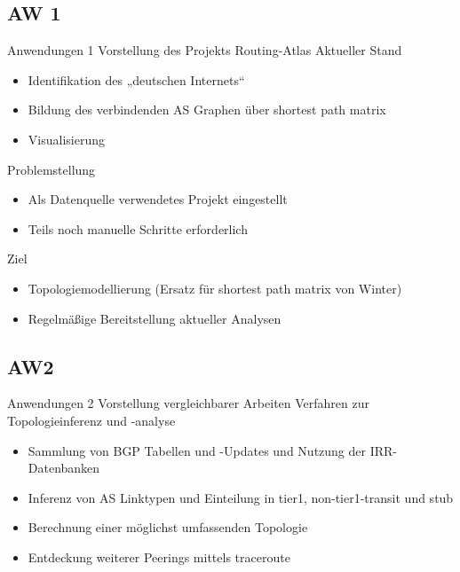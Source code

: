 \documentclass[ngerman,compress,hyperref={bookmarks}]{beamer}
\begin{document}
\subsection{AW 1}
\begin{frame}{Anwendungen 1 \cite{KrohnAW1}}{Vorstellung des Projekts Routing-Atlas}
  Aktueller Stand\\
  \begin{itemize}
    \item Identifikation des „deutschen Internets“
    \item Bildung des verbindenden AS Graphen über shortest path matrix
    \item Visualisierung
  \end{itemize}
  \vspace{0.3cm}
  Problemstellung\\
  \begin{itemize}
    \item Als Datenquelle verwendetes Projekt eingestellt
    \item Teils noch manuelle Schritte erforderlich
  \end{itemize}
  \vspace{0.3cm}
  Ziel\\
  \begin{itemize}
    \item Topologiemodellierung (Ersatz für shortest path matrix von Winter)
    \item Regelmäßige Bereitstellung aktueller Analysen
  \end{itemize}
\end{frame}

\subsection{AW2}
\begin{frame}{Anwendungen 2 \cite{KrohnAW2}}{Vorstellung vergleichbarer Arbeiten}
  Verfahren zur Topologieinferenz und -analyse
  \begin{itemize}
    \item Sammlung von BGP Tabellen und -Updates und Nutzung der IRR-Datenbanken \cite{Zhang:2005:CIA:1052812.1052825}
    \item Inferenz von AS Linktypen und Einteilung in tier1, non-tier1-transit und stub \cite{Gao:2001:IAS:504611.504616}
    \item Berechnung einer möglichst umfassenden Topologie \cite{Winter:2009:MIR:1577959.1577976}
    \item Entdeckung weiterer Peerings mittels traceroute \cite{Augustin:2009:IM:1644893.1644934}
  \end{itemize}
\end{frame}
\end{document}
